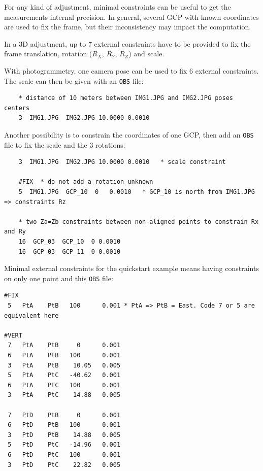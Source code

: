 For any kind of adjustment, minimal constraints can be useful to get the measurements internal precision.
In general, several GCP with known coordinates are used to fix the frame, but their inconsistency may
impact the computation.

In a 3D adjustment, up to 7 external constraints have to be provided to fix the frame translation, rotation ($R_X$, $R_Y$, $R_Z$) and scale.

With photogrammetry, one camera pose can be used to fix 6 external constraints. The scale can then be given with an \texttt{OBS} file:
\begin{verbatim}
    * distance of 10 meters between IMG1.JPG and IMG2.JPG poses centers
    3  IMG1.JPG  IMG2.JPG 10.0000 0.0010   
\end{verbatim}

Another possibility is to constrain the coordinates of one GCP, then add an \texttt{OBS} file to fix the scale and the 3 rotations:
\begin{verbatim}
    3  IMG1.JPG  IMG2.JPG 10.0000 0.0010   * scale constraint

    #FIX  * do not add a rotation unknown
    5  IMG1.JPG  GCP_10  0   0.0010   * GCP_10 is north from IMG1.JPG => constraints Rz

    * two Za=Zb constraints between non-aligned points to constrain Rx and Ry
    16  GCP_03  GCP_10  0 0.0010
    16  GCP_03  GCP_11  0 0.0010
\end{verbatim}

Minimal external constraints for the quickstart example means having constraints on only one point and this \texttt{OBS} file:

\begin{verbatim}
#FIX
 5   PtA    PtB   100      0.001 * PtA => PtB = East. Code 7 or 5 are equivalent here
 
#VERT
 7   PtA    PtB     0      0.001
 6   PtA    PtB   100      0.001
 3   PtA    PtB    10.05   0.005
 5   PtA    PtC   -40.62   0.001
 6   PtA    PtC   100      0.001
 3   PtA    PtC    14.88   0.005

 7   PtD    PtB     0      0.001
 6   PtD    PtB   100      0.001
 3   PtD    PtB    14.88   0.005
 5   PtD    PtC   -14.96   0.001
 6   PtD    PtC   100      0.001
 3   PtD    PtC    22.82   0.005
\end{verbatim}


